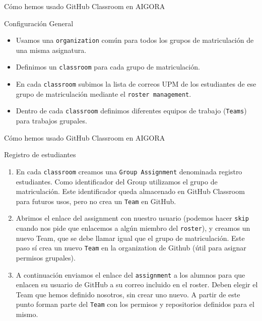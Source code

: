 \documentclass[xcolor={usenames,svgnames,dvipsnames}]{beamer}
\begin{document}
\begin{frame}[label={sec:org6761d50},fragile]{Cómo hemos usado GitHub Classroom en AIGORA}
 \begin{block}{Configuración General}
\begin{itemize}
\item Usamos una \texttt{organization} común para todos los grupos de matriculación de una misma asignatura.
\item Definimos un \texttt{classroom} para cada grupo de matriculación.
\item En cada \texttt{classroom} subimos la lista de correos UPM de los estudiantes de ese grupo de matriculación mediante el \texttt{roster management}.
\item Dentro de cada \texttt{classroom} definimos diferentes equipos de trabajo (\texttt{Teams}) para trabajos grupales.
\end{itemize}
\end{block}
\end{frame}
\begin{frame}[label={sec:org66e4c2a},fragile]{Cómo hemos usado GitHub Classroom en AIGORA}
 \begin{block}{Registro de estudiantes}
\begin{enumerate}
\item En cada \texttt{classroom} creamos una \texttt{Group Assignment} denominada \guillemotleft{}registro estudiantes\guillemotright{}. Como identificador del \guillemotleft{}Group\guillemotright{} utilizamos el grupo de matriculación. Este identificador queda almacenado en GitHub Classroom para futuros usos, pero \alert{no} crea un \texttt{Team} en GitHub.
\item Abrimos el enlace del assignment con nuestro usuario (podemos hacer \texttt{skip} cuando nos pide que enlacemos a algún miembro del \texttt{roster}), y \alert{creamos un nuevo Team}, que se debe llamar igual que el grupo de matriculación. Este paso \alert{sí} crea un nuevo \texttt{Team} en la organization de Github (útil para asignar permisos grupales).
\item A continuación enviamos el enlace del \texttt{assignment} a los alumnos para que enlacen su usuario de GitHub a su correo incluido en el roster.  \alert{Deben elegir el Team que hemos definido nosotros, sin crear uno nuevo}. A partir de este punto forman parte del \texttt{Team} con los permisos y repositorios definidos para el mismo.
\end{enumerate}
\end{block}
\end{frame}
\end{document}
